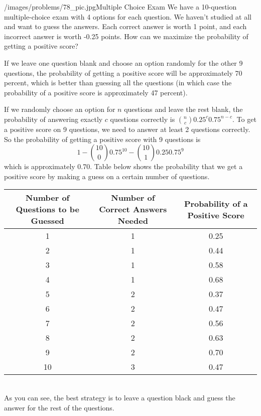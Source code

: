 \begin{problem}{/images/problems/78_pic.jpg}{Multiple Choice Exam} We have a 10-question multiple-choice exam with 4 options for each question. We haven't studied at all and want to guess the answers. Each correct answer is worth 1 point, and each incorrect answer is worth -0.25 points.
	How can we maximize the probability of getting a positive score?
\end{problem}

\begin{solution}
If we leave one question blank and choose an option randomly for the other 9 questions, the probability of getting a positive score will be approximately 70 percent, which is better than guessing all the questions (in which case the probability of a positive score is approximately 47 percent).

If we randomly choose an option for $n$ questions and leave the rest blank, the probability of answering exactly $c$ questions correctly is $\binom{n}{c} 0.25^c 0.75^{n-c}$. To get a positive score on 9 questions, we need to answer at least 2 questions correctly. So the probability of getting a positive score with 9 questions is $$1 - \binom{10}{0} 0.75^{10} - \binom{10}{1} 0.25 0.75^{9}$$ which is approximately 0.70. Table below shows the probability that we get a positive score by making a guess on a certain number of questions.\\[0.2cm]
\begin{tabular}{|c|c|c|}
\hline
 Number of Questions to be Guessed &  Number of Correct Answers Needed &  Probability of a Positive Score \\
\hline
1 &  1 &  0.25 \\
\hline
2 &  1 &  0.44 \\
\hline
3 &  1 &  0.58 \\
\hline
4 &  1 &  0.68 \\
\hline
5 &  2 &  0.37 \\
\hline
6 &  2 &  0.47 \\
\hline
7 &  2 &  0.56 \\
\hline
8 &  2 &  0.63 \\
\hline
9 &  2 &  0.70 \\
\hline
10 &  3 &  0.47 \\
\hline
\end{tabular}
\\[0.2cm]
As you can see, the best strategy is to leave a question black and guess the answer for the rest of the questions.
\end{solution}

